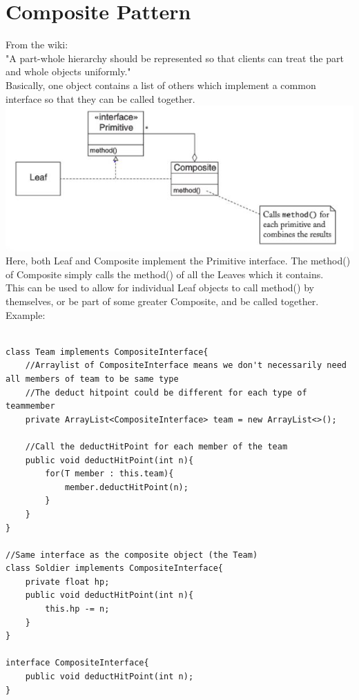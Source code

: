 \documentclass[12pt]{article}
\theoremstyle{definition}
\begin{document}
\section{Composite Pattern}
From the wiki:
\\ \linebreak
"A part-whole hierarchy should be represented so that clients can treat the part and whole objects uniformly."
\\ \linebreak
Basically, one object contains a list of others which implement a common interface so that they can be called together.
\\ \linebreak
\includegraphics{composite}
\\
Here, both Leaf and Composite implement the Primitive interface. The method() of Composite simply calls the method() of all the Leaves which it contains. 
\\ \linebreak
This can be used to allow for individual Leaf objects to call method() by themselves, or be part of some greater Composite, and be called together.
\\ \linebreak
Example:
\begin{lstlisting}

class Team implements CompositeInterface{
	//Arraylist of CompositeInterface means we don't necessarily need all members of team to be same type
	//The deduct hitpoint could be different for each type of teammember
	private ArrayList<CompositeInterface> team = new ArrayList<>();
	
	//Call the deductHitPoint for each member of the team
	public void deductHitPoint(int n){
		for(T member : this.team){
			member.deductHitPoint(n);
		}
	}
}

//Same interface as the composite object (the Team)
class Soldier implements CompositeInterface{
	private float hp;
	public void deductHitPoint(int n){
		this.hp -= n;
	}
}

interface CompositeInterface{
	public void deductHitPoint(int n);
}
\end{lstlisting}
\end{document}
